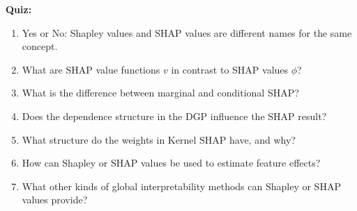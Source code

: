 \textbf{Quiz:}
\begin{enumerate}
    \item Yes or No: Shapley values and SHAP values are different names for the same concept.
    \item What are SHAP value functions $v$ in contrast to SHAP values $\phi$?
    \item What is the difference between marginal and conditional SHAP?
    \item Does the dependence structure in the DGP influence the SHAP result?
    \item What structure do the weights in Kernel SHAP have, and why?
    \item How can Shapley or SHAP values be used to estimate feature effects?
    \item What other kinds of global interpretability methods can Shapley or SHAP values provide?
\end{enumerate}
